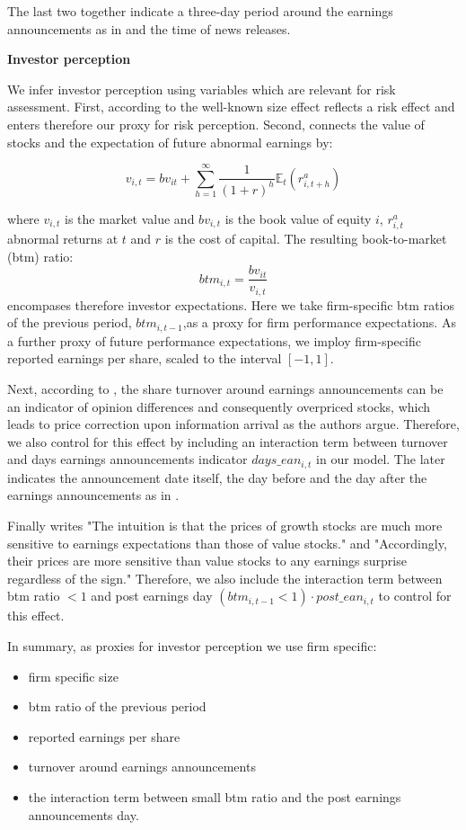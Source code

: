 \documentclass[]{article}
\providecommand{\tightlist}{%
  \setlength{\itemsep}{0pt}\setlength{\parskip}{0pt}}
\begin{document}
The last two together indicate a three-day period around the earnings announcements as in \cite{BERKMAN2009} and the time of news releases.

\vspace{0.5cm}
{\bf {Investor perception}}

We infer investor perception using variables which are relevant for risk assessment.
First, according to \cite{FRIEND1988} the well-known size effect reflects a risk effect and enters therefore our proxy for risk perception. 
Second, \cite{Peasnell1982} connects the value of stocks and the expectation of future abnormal earnings by:

\[v_{i,t}= bv_{it} + \sum_{h=1}^\infty \frac1{(1+r)^h}\mathbb E_t(r_{i,t+h}^a)\]

where $v_{i,t}$ is the market value and $bv_{i,t}$ is the book value of  equity $i$, $r_{i,t}^a$ abnormal returns at $t$ and $r$ is the cost of capital. The resulting book-to-market (btm) ratio:
\[btm_{i,t} = \frac{bv_{it}}{v_{i,t}}\]
encompases therefore investor expectations. Here we take firm-specific btm ratios of the previous period, $btm_{i,t-1}$,as a proxy for firm performance expectations.  As a further proxy of future performance expectations, we imploy firm-specific reported earnings per share, scaled to the interval $[-1,1]$.

Next, according to \cite{BERKMAN2009}, the share turnover around earnings announcements can be an indicator of opinion differences and consequently overpriced stocks, which leads to price correction upon information arrival as the authors argue. Therefore, we also control for this effect by including an interaction term between turnover and days earnings announcements indicator $days\_ean_{i,t}$ in our model. The later indicates the announcement date itself, the day before and the day after the earnings announcements as in \cite{BERKMAN2009}.

Finally \cite{DONNELLY2014} writes "The intuition is that the prices of growth stocks are much more sensitive to earnings expectations than those of value stocks." and "Accordingly, their prices are more sensitive than value stocks to any earnings surprise regardless of the sign." Therefore, we also include the interaction term between btm ratio $<1$ and post earnings day $(btm_{i,t-1}<1)\cdot post\_ean_{i,t}$ to control for this effect.

In summary, as proxies for investor perception we use firm specific:

\begin{itemize}
\tightlist
\item
  firm specific size 
\item
  btm ratio of the previous period
\item reported earnings per share
\item
  turnover around earnings announcements
\item
  the interaction term between small btm ratio and the post earnings announcements day.
\end{itemize}
\end{document}
